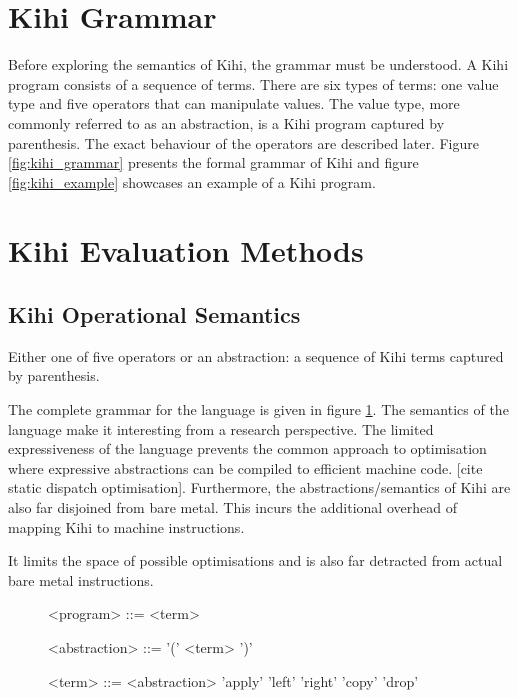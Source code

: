 
\section{Kihi Grammar}
Before exploring the semantics of Kihi, the grammar must be understood. A Kihi program consists of a sequence of terms. There are six types of terms: one value type and five operators that can manipulate values. The value type, more commonly referred to as an abstraction, is a Kihi program captured by parenthesis. The exact behaviour of the operators are described later. Figure \ref{fig:kihi_grammar} presents the formal grammar of Kihi and figure \ref{fig:kihi_example} showcases an example of a Kihi program.

\section{Kihi Evaluation Methods}

\subsection{Kihi Operational Semantics}



Either
one of five operators or an abstraction: a sequence of Kihi terms
captured by parenthesis. 

The complete grammar for the language is given
in figure \ref{fig:grammar}. The semantics of the language make it
interesting from a research perspective. The limited expressiveness of
the language prevents the common approach to optimisation where expressive
abstractions can be compiled to efficient machine code. [cite static
dispatch optimisation]. Furthermore, the abstractions/semantics of Kihi are
also far disjoined from bare metal. This incurs the additional overhead of
mapping Kihi to machine instructions.

It limits the space of possible
optimisations and is also far detracted from actual bare metal instructions.


\begin{figure}[htb]       
    \centering
    \begin{grammar}
    <program> ::= { <term> }

    <abstraction> ::= '(' <term> ')'

    <term> ::= <abstraction>
        \alt 'apply'
        \alt 'left'
        \alt 'right'
        \alt 'copy'
        \alt 'drop'
    
      \end{grammar}
    \caption{}
    \label{fig:grammar}
\end{figure}



